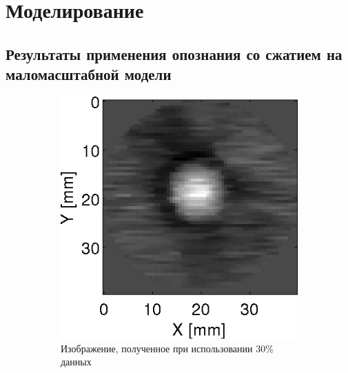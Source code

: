 \documentclass[14pt]{matmex-diploma}
\begin{document}
\section{Моделирование}

\subsection{Результаты применения опознания со сжатием на маломасштабной модели}
\begin{figure}[h]

\begin{subfigure}{.32\textwidth}
    \centering
    \includegraphics[width=1\linewidth]{pics/ref_kwave_30p.png}
    \caption{Изображение, полученное при использовании 30\% данных}
    \label{fig:percents_30}
\end{subfigure}
\begin{subfigure}{.32\textwidth}
    \centering

\end{subfigure}
\end{figure}
\end{document}
